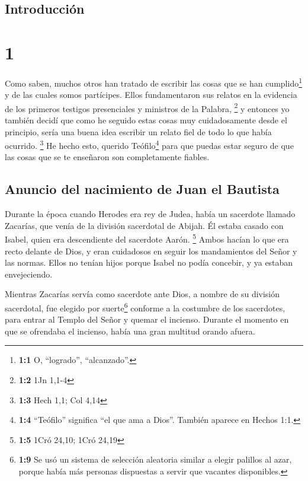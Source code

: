 \hypertarget{introducciuxf3n}{%
\subsection{Introducción}\label{introducciuxf3n}}

\hypertarget{section}{%
\section{1}\label{section}}

 Como saben, muchos otros han tratado de escribir las
cosas que se han cumplido\footnote{\textbf{1:1} O, ``logrado'',
  ``alcanzado''.} y de las cuales somos partícipes.  Ellos
fundamentaron sus relatos en la evidencia de los primeros testigos
presenciales y ministros de la Palabra, \footnote{\textbf{1:2} 1Jn 1,1-4}
 y entonces yo también decidí que como he seguido estas
cosas muy cuidadosamente desde el principio, sería una buena idea
escribir un relato fiel de todo lo que había ocurrido. \footnote{\textbf{1:3}
  Hech 1,1; Col 4,14}  He hecho esto, querido
Teófilo\footnote{\textbf{1:4} ``Teófilo'' significa ``el que ama a
  Dios''. También aparece en Hechos 1:1.} para que puedas estar seguro
de que las cosas que se te enseñaron son completamente fiables.

\hypertarget{anuncio-del-nacimiento-de-juan-el-bautista}{%
\subsection{Anuncio del nacimiento de Juan el
Bautista}\label{anuncio-del-nacimiento-de-juan-el-bautista}}

 Durante la época cuando Herodes era rey de Judea, había
un sacerdote llamado Zacarías, que venía de la división sacerdotal de
Abijah. Él estaba casado con Isabel, quien era descendiente del
sacerdote Aarón. \footnote{\textbf{1:5} 1Cró 24,10; 1Cró 24,19}
 Ambos hacían lo que era recto delante de Dios, y eran
cuidadosos en seguir los mandamientos del Señor y las normas.
 Ellos no tenían hijos porque Isabel no podía concebir, y
ya estaban envejeciendo.

 Mientras Zacarías servía como sacerdote ante Dios, a
nombre de su división sacerdotal,  fue elegido por
suerte\footnote{\textbf{1:9} Se usó un sistema de selección aleatoria
  similar a elegir palillos al azar, porque había más personas
  dispuestas a servir que vacantes disponibles.} conforme a la costumbre
de los sacerdotes, para entrar al Templo del Señor y quemar el incienso.
 Durante el momento en que se ofrendaba el incienso,
había una gran multitud orando afuera.

